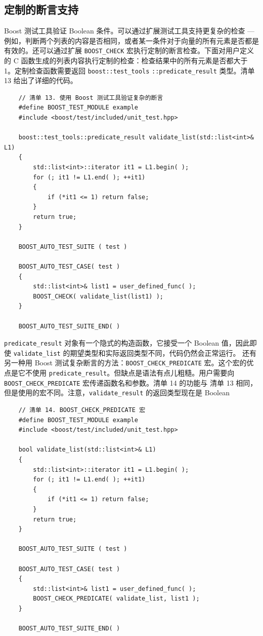 \documentclass[UTF8,a4paper,12pt]{ctexbook}
\begin{document}
		 \subsection{定制的断言支持}
			 Boost 测试工具验证 Boolean 条件。可以通过扩展测试工具支持更复杂的检查 — 例如，判断两个列表的内容是否相同，或者某一条件对于向量的所有元素是否都是有效的。还可以通过扩展 \verb|BOOST_CHECK| 宏执行定制的断言检查。下面对用户定义的 C 函数生成的列表内容执行定制的检查：检查结果中的所有元素是否都大于 1。定制检查函数需要返回 \verb|boost::test_tools|
			 \verb|::predicate_result| 类型。清单 13 给出了详细的代码。
			 \begin{lstlisting}
	// 清单 13. 使用 Boost 测试工具验证复杂的断言
	#define BOOST_TEST_MODULE example
	#include <boost/test/included/unit_test.hpp>
	
	boost::test_tools::predicate_result validate_list(std::list<int>& L1)
	{ 
		std::list<int>::iterator it1 = L1.begin( );
		for (; it1 != L1.end( ); ++it1) 
		{ 
			if (*it1 <= 1) return false; 
		}
		return true;
	}
	
	BOOST_AUTO_TEST_SUITE ( test ) 
	
	BOOST_AUTO_TEST_CASE( test )
	{
		std::list<int>& list1 = user_defined_func( );
		BOOST_CHECK( validate_list(list1) );
	}
	
	BOOST_AUTO_TEST_SUITE_END( )
			 \end{lstlisting}
			 \verb|predicate_result| 对象有一个隐式的构造函数，它接受一个 Boolean 值，因此即使 \verb|validate_list| 的期望类型和实际返回类型不同，代码仍然会正常运行。
			 还有另一种用 Boost 测试复杂断言的方法：\verb|BOOST_CHECK_PREDICATE| 宏。这个宏的优点是它不使用 \verb|predicate_result|。但缺点是语法有点儿粗糙。用户需要向 \verb|BOOST_CHECK_PREDICATE| 宏传递函数名和参数。清单 14 的功能与 清单 13 相同，但是使用的宏不同。注意，\verb|validate_result| 的返回类型现在是 Boolean
			\begin{lstlisting}
	// 清单 14. BOOST_CHECK_PREDICATE 宏
	#define BOOST_TEST_MODULE example
	#include <boost/test/included/unit_test.hpp>
	
	bool validate_list(std::list<int>& L1)
	{ 
		std::list<int>::iterator it1 = L1.begin( );
		for (; it1 != L1.end( ); ++it1) 
		{ 
			if (*it1 <= 1) return false; 
		}
		return true;
	}
	
	BOOST_AUTO_TEST_SUITE ( test ) 
	
	BOOST_AUTO_TEST_CASE( test )
	{
		std::list<int>& list1 = user_defined_func( );
		BOOST_CHECK_PREDICATE( validate_list, list1 );
	}
	
	BOOST_AUTO_TEST_SUITE_END( )
			\end{lstlisting}
\end{document}
